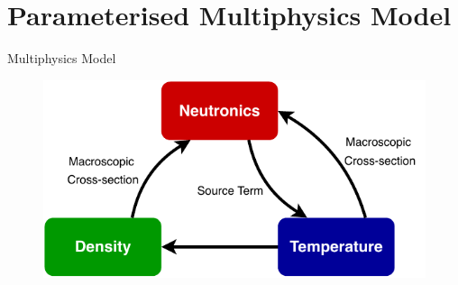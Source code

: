 \documentclass{beamer}
\begin{document}
\section{Parameterised Multiphysics Model} 
\begin{frame}{Multiphysics Model}
    \begin{figure}
        \centering
        \includegraphics{Multiphysics.pdf}
    \end{figure}
\end{frame}
\end{document}
